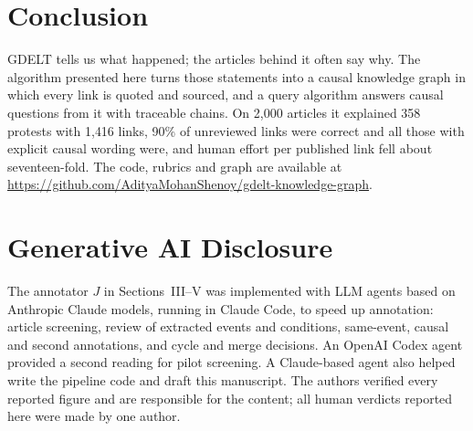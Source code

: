\documentclass[conference]{IEEEtran}
\begin{document}
\section{Conclusion}
GDELT tells us what happened; the articles behind it often say why. The algorithm presented here
turns those statements into a causal knowledge graph in which every link is quoted and sourced, and
a query algorithm answers causal questions from it with traceable chains. On 2{,}000 articles it
explained 358 protests with 1{,}416 links, 90\% of unreviewed links were correct and all those with
explicit causal wording were, and human effort per published link fell about seventeen-fold. The
code, rubrics and graph are available at
\url{https://github.com/AdityaMohanShenoy/gdelt-knowledge-graph}.

\section*{Generative AI Disclosure}
The annotator $J$ in Sections~III--V was implemented with LLM agents based on Anthropic Claude
models, running in Claude Code, to speed up annotation: article screening, review of extracted
events and conditions, same-event, causal and second annotations, and cycle and merge decisions. An
OpenAI Codex agent provided a second reading for pilot screening. A Claude-based agent also helped
write the pipeline code and draft this manuscript. The authors verified every reported figure and are
responsible for the content; all human verdicts reported here were made by one author.
\end{document}
